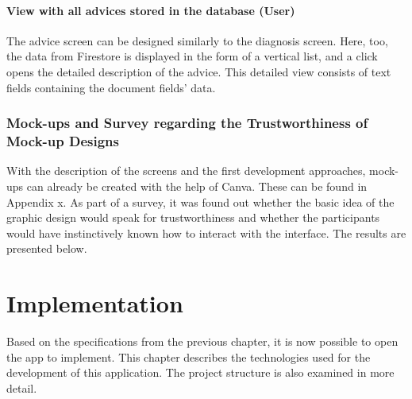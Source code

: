 \subsubsection{\textbf{View with all advices stored in the database (User) }}
The advice screen can be designed similarly to the diagnosis screen. Here, too, the data from Firestore is displayed in the form of a vertical list, and a click opens the detailed description of the advice. This detailed view consists of text fields containing the document fields' data.

\subsection{Mock-ups and Survey regarding the Trustworthiness of Mock-up Designs}
With the description of the screens and the first development approaches, mock-ups can already be created with the help of Canva. These can be found in Appendix x. As part of a survey, it was found out whether the basic idea of the graphic design would speak for trustworthiness and whether the participants would have instinctively known how to interact with the interface. The results are presented below.






















\chapter{Implementation}
Based on the specifications from the previous chapter, it is now possible to open the app to implement. This chapter describes the technologies used for the development of this application. The project structure is also examined in more detail.
